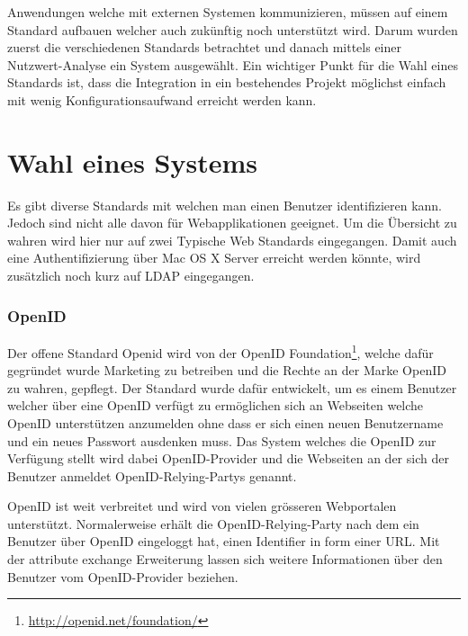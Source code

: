 Anwendungen welche mit externen Systemen kommunizieren, müssen auf einem Standard aufbauen welcher auch zukünftig noch unterstützt wird. Darum wurden zuerst die verschiedenen Standards betrachtet und danach mittels einer Nutzwert-Analyse ein System ausgewählt. Ein wichtiger Punkt für die Wahl eines Standards ist, dass die Integration in ein bestehendes Projekt möglichst einfach mit wenig Konfigurationsaufwand erreicht werden kann.

\section{Wahl eines Systems}
\label{sec:Wahl eines Systems}
Es gibt diverse Standards mit welchen man einen Benutzer identifizieren kann. Jedoch sind nicht alle davon für Webapplikationen geeignet. Um die Übersicht zu wahren wird hier nur auf zwei Typische Web Standards eingegangen. Damit auch eine Authentifizierung über Mac OS X Server erreicht werden könnte, wird zusätzlich noch kurz auf LDAP eingegangen.

\subsubsection{OpenID}
\label{ssub:OpenID}
Der offene Standard Openid wird von der OpenID
Foundation\footnote{\url{http://openid.net/foundation/}}, welche dafür gegründet wurde Marketing zu betreiben und die Rechte an der Marke OpenID zu wahren, gepflegt. Der Standard wurde dafür entwickelt, um es einem Benutzer welcher über eine OpenID verfügt zu ermöglichen sich an Webseiten welche OpenID unterstützen anzumelden ohne dass er sich einen neuen Benutzername und ein neues Passwort ausdenken muss. Das System welches die OpenID zur Verfügung stellt wird dabei \gls{OpenID-Provider} und die Webseiten an der sich der Benutzer anmeldet \glspl{OpenID-Relying-Party} genannt.

OpenID ist weit verbreitet und wird von vielen grösseren Webportalen unterstützt. Normalerweise erhält die \gls{OpenID-Relying-Party} nach dem ein Benutzer über OpenID eingeloggt hat, einen Identifier in form einer URL. Mit der attribute exchange Erweiterung lassen sich weitere Informationen über den Benutzer vom \gls{OpenID-Provider} beziehen.

